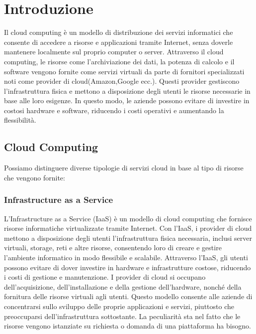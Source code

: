 \documentclass[../main.tex]{subfiles}
\begin{document}
    
\chapter{Introduzione}

Il cloud computing è un modello di distribuzione dei servizi informatici che consente di accedere a risorse e applicazioni tramite Internet, senza doverle mantenere localmente sul proprio computer o server. 
Attraverso il cloud computing, le risorse come l'archiviazione dei dati, la potenza di calcolo e il software vengono fornite come servizi virtuali da parte di fornitori specializzati noti come provider di cloud(Amazon,Google ecc.).
Questi provider gestiscono l'infrastruttura fisica e mettono a disposizione degli utenti le risorse necessarie in base alle loro esigenze. In questo modo, le aziende possono evitare di investire in costosi hardware e software, riducendo i costi operativi e aumentando la flessibilità.

\section{Cloud Computing}
Possiamo distinguere diverse tipologie di servizi cloud in base al tipo di risorse che vengono fornite:
\subsection{Infrastructure as a Service}
L'Infrastructure as a Service (IaaS) è un modello di cloud computing che fornisce risorse informatiche virtualizzate tramite Internet. Con l'IaaS, i provider di cloud mettono a disposizione degli utenti l'infrastruttura fisica necessaria, inclusi server virtuali, storage, reti e altre risorse, consentendo loro di creare e gestire l'ambiente informatico in modo flessibile e scalabile.
Attraverso l'IaaS, gli utenti possono evitare di dover investire in hardware e infrastrutture costose, riducendo i costi di gestione e manutenzione. I provider di cloud si occupano dell'acquisizione, dell'installazione e della gestione dell'hardware, nonché della fornitura delle risorse virtuali agli utenti. Questo modello consente alle aziende di concentrarsi sullo sviluppo delle proprie applicazioni e servizi, piuttosto che preoccuparsi dell'infrastruttura sottostante.
La peculiarità sta nel fatto che le risorse vengono istanziate su richiesta o domanda di una piattaforma ha bisogno.
\end{document}

